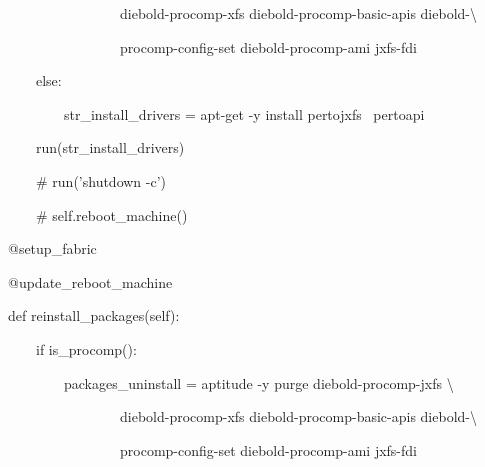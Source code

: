 {\ttfamily\color[rgb]{0.10980392,0.10980392,0.10980392}
    \ \ \ \ \ \ \ \ \ \ \ \ \ \ \ \ \ \ \ \ diebold-procomp-xfs diebold-procomp-basic-apis diebold-{\textbackslash}}

{\ttfamily\color[rgb]{0.10980392,0.10980392,0.10980392}
    \ \ \ \ \ \ \ \ \ \ \ \ \ \ \ \ \ \ \ \ procomp-config-set diebold-procomp-ami
        jxfs-fdi{\textquotedbl}{\textquotedbl}{\textquotedbl}}

{\ttfamily\color[rgb]{0.10980392,0.10980392,0.10980392}
    \ \ \ \ \ \ \ \ else:}

{\ttfamily\color[rgb]{0.10980392,0.10980392,0.10980392}
    \ \ \ \ \ \ \ \ \ \ \ \ str\_install\_drivers = {\textquotedbl}{\textquotedbl}{\textquotedbl}apt-get -y install
        pertojxfs \ pertoapi{\textquotedbl}{\textquotedbl}{\textquotedbl}}


        \bigskip

{\ttfamily\color[rgb]{0.10980392,0.10980392,0.10980392}
    \ \ \ \ \ \ \ \ run(str\_install\_drivers)}

{\ttfamily\color[rgb]{0.10980392,0.10980392,0.10980392}
    \ \ \ \ \ \ \ \ \# run('shutdown -c')}

{\ttfamily\color[rgb]{0.10980392,0.10980392,0.10980392}
    \ \ \ \ \ \ \ \ \# self.reboot\_machine()}


    \bigskip

{\ttfamily\color[rgb]{0.10980392,0.10980392,0.10980392}
    \ \ \ \ @setup\_fabric}

{\ttfamily\color[rgb]{0.10980392,0.10980392,0.10980392}
    \ \ \ \ @update\_reboot\_machine}

{\ttfamily\color[rgb]{0.10980392,0.10980392,0.10980392}
    \ \ \ \ def reinstall\_packages(self):}

{\ttfamily\color[rgb]{0.10980392,0.10980392,0.10980392}
    \ \ \ \ \ \ \ \ if is\_procomp():}

{\ttfamily\color[rgb]{0.10980392,0.10980392,0.10980392}
    \ \ \ \ \ \ \ \ \ \ \ \ packages\_uninstall = {\textquotedbl}{\textquotedbl}{\textquotedbl}aptitude -y purge
        diebold-procomp-jxfs {\textbackslash}}

{\ttfamily\color[rgb]{0.10980392,0.10980392,0.10980392}
    \ \ \ \ \ \ \ \ \ \ \ \ \ \ \ \ \ \ \ \ diebold-procomp-xfs diebold-procomp-basic-apis diebold-{\textbackslash}}

{\ttfamily\color[rgb]{0.10980392,0.10980392,0.10980392}
    \ \ \ \ \ \ \ \ \ \ \ \ \ \ \ \ \ \ \ \ procomp-config-set diebold-procomp-ami
        jxfs-fdi{\textquotedbl}{\textquotedbl}{\textquotedbl}}

